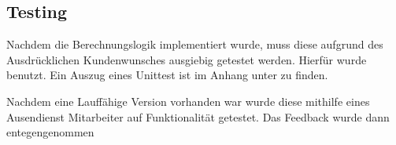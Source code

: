 \subsection{Testing}

Nachdem die Berechnungslogik implementiert wurde, muss diese aufgrund des Ausdrücklichen Kundenwunsches ausgiebig getestet werden. Hierfür wurde  benutzt. Ein Auszug eines Unittest ist im Anhang unter  zu finden.

Nachdem eine Lauffähige Version vorhanden war wurde diese mithilfe eines Ausendienst Mitarbeiter auf Funktionalität getestet.
Das Feedback wurde dann entegengenommen \todo